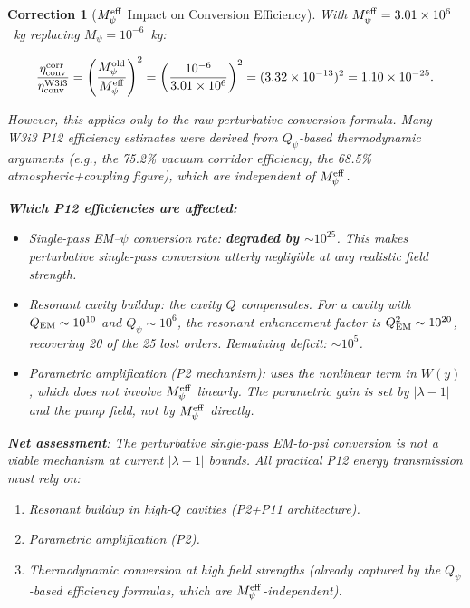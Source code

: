 \documentclass[aps,prd,twocolumn,superscriptaddress,nofootinbib]{revtex4-2}
\newcommand{\Qpsi}{Q_\psi}
\newcommand{\Meff}{M_\psi^{\rm eff}}
\newcommand{\ee}[1]{\times 10^{#1}}
\newtheorem{correction}{Correction}
\begin{document}
\begin{correction}[$\Meff$ Impact on Conversion Efficiency]
\label{corr:conversion}
With $\Meff = 3.01\ee{6}$~kg replacing $M_\psi = 10^{-6}$~kg:

\begin{equation}
\frac{\eta_{\rm conv}^{\rm corr}}{\eta_{\rm conv}^{\rm W3i3}}
= \left(\frac{M_\psi^{\rm old}}{\Meff}\right)^2
= \left(\frac{10^{-6}}{3.01\ee{6}}\right)^2
= (3.32\ee{-13})^2 = 1.10\ee{-25}.
\label{eq:conv_correction}
\end{equation}

However, this applies only to the raw perturbative conversion formula.
Many W3i3 P12 efficiency estimates were derived from $\Qpsi$-based
thermodynamic arguments (e.g., the 75.2\% vacuum corridor efficiency,
the 68.5\% atmospheric+coupling figure), which are independent of $\Meff$.

\textbf{Which P12 efficiencies are affected:}
\begin{itemize}
\item Single-pass EM--$\psi$ conversion rate: \textbf{degraded by
  $\sim 10^{25}$}. This makes perturbative single-pass conversion
  \emph{utterly negligible} at any realistic field strength.
\item Resonant cavity buildup: the cavity $Q$ compensates. For a cavity
  with $Q_{\rm EM} \sim 10^{10}$ and $\Qpsi \sim 10^6$, the resonant
  enhancement factor is $Q_{\rm EM}^2 \sim 10^{20}$, recovering 20
  of the 25 lost orders. Remaining deficit: $\sim 10^5$.
\item Parametric amplification (P2 mechanism): uses the nonlinear
  term in $W(y)$, which does not involve $\Meff$ linearly. The
  parametric gain is set by $|\lambda-1|$ and the pump field, not
  by $\Meff$ directly.
\end{itemize}

\textbf{Net assessment}: The perturbative single-pass EM-to-psi
conversion is not a viable mechanism at current $|\lambda-1|$ bounds.
All practical P12 energy transmission must rely on:
\begin{enumerate}
\item Resonant buildup in high-$Q$ cavities (P2+P11 architecture).
\item Parametric amplification (P2).
\item Thermodynamic conversion at high field strengths (already
  captured by the $\Qpsi$-based efficiency formulas, which are
  $\Meff$-independent).
\end{enumerate}
\end{correction}
\end{document}
